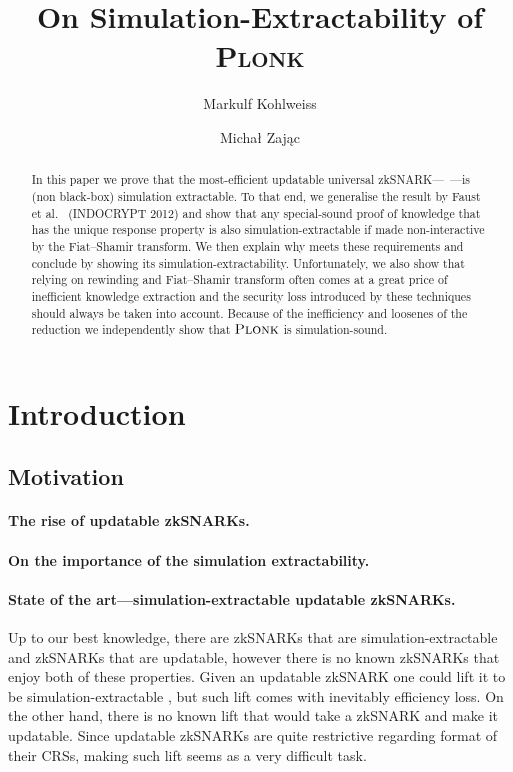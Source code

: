 \documentclass[runningheads,11pt]{llncs}
\title{On Simulation-Extractability of \textsc{Plonk}}
\author{Markulf Kohlweiss\inst{1,2} \and Michał Zając\inst{3}}
\institute{University of Edinburgh, Edinburgh, UK \and IOHK \\ \email{mkohlwei@inf.ed.ac.uk} \and Clearmatics, London UK \\ \email{m.p.zajac@gmail.com}}
\theoremstyle{definition}
\begin{document}
	\sloppy
	\maketitle

\begin{abstract}
	In this paper we prove that the most-efficient updatable universal zkSNARK---\plonk{}~\cite{EPRINT:GabWilCio19}---is (non black-box) simulation extractable.
	To that end, we generalise the result by Faust et al.~\cite{INDOCRYPT:FKMV12} (INDOCRYPT 2012) and show that any special-sound proof of knowledge that has the unique response property is also simulation-extractable if made non-interactive by the Fiat--Shamir transform. 
	We then explain why \plonk{} meets these requirements and conclude by showing its simulation-extractability.
	Unfortunately, we also show that relying on rewinding and Fiat--Shamir transform often comes at a great price of inefficient knowledge extraction and the security loss introduced by these techniques should always be taken into account.
	Because of the inefficiency and loosenes of the reduction we independently show that $\textsc{Plonk}{}$ is simulation-sound. 
\end{abstract}

\section{Introduction}
\subsection{Motivation}
\paragraph{The rise of updatable zkSNARKs.}
\cite{C:GKMMM18}
\cite{EC:CHMMVW20}
\cite{CCS:MBKM19}
\cite{EPRINT:GabWilCio19}
\cite{EPRINT:Gabizon19c}
\cite{EPRINT:Lipmaa19a}

\paragraph{On the importance of the simulation extractability.}
\cite{AC:DHLW10}
\cite{AC:Groth07}
\cite{EPRINT:AbdRamSla20}
\cite{EPRINT:KZMQCP15}
\cite{EPRINT:AtaBag19}

\paragraph{State of the art---simulation-extractable updatable zkSNARKs.}
Up to our best knowledge, there are zkSNARKs that are simulation-extractable and zkSNARKs that are updatable, however there is no known zkSNARKs that enjoy both of these properties.
Given an updatable zkSNARK one could lift it to be simulation-extractable , but such lift comes with inevitably efficiency loss.
On the other hand, there is no known lift that would take a zkSNARK and make it updatable. Since updatable zkSNARKs are quite restrictive regarding format of their CRSs, making such lift seems as a very difficult task. 
\end{document}
